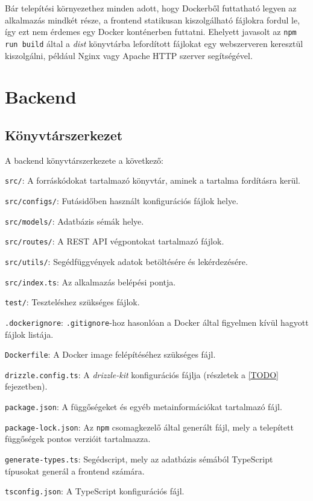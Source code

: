 Bár telepítési környezethez minden adott, hogy Dockerből futtatható legyen az alkalmazás mindkét része, a frontend statikusan kiszolgálható fájlokra fordul le, így ezt nem érdemes egy Docker konténerben futtatni. Ehelyett javasolt az \texttt{npm run build} által a \textit{dist} könyvtárba lefordított fájlokat egy webszerveren keresztül kiszolgálni, például Nginx vagy Apache HTTP szerver segítségével.

\section{Backend}

\subsection{Könyvtárszerkezet}

A backend könyvtárszerkezete a következő:

\begin{compactitem}
    \item \texttt{src/}: A forráskódokat tartalmazó könyvtár, aminek a tartalma fordításra kerül.
    \item \texttt{src/configs/}: Futásidőben használt konfigurációs fájlok helye.
    \item \texttt{src/models/}: Adatbázis sémák helye.
    \item \texttt{src/routes/}: A REST API végpontokat tartalmazó fájlok.
    \item \texttt{src/utils/}: Segédfüggvények adatok betöltésére és lekérdezésére.
    \item \texttt{src/index.ts}: Az alkalmazás belépési pontja.
    \item \texttt{test/}: Teszteléshez szükséges fájlok.
    \item \texttt{.dockerignore}: \texttt{.gitignore}-hoz hasonlóan a Docker által figyelmen kívül hagyott fájlok listája.
    \item \texttt{Dockerfile}: A Docker image felépítéséhez szükséges fájl.
    \item \texttt{drizzle.config.ts}: A \textit{drizzle-kit} konfigurációs fájlja (részletek a \ref{TODO} fejezetben).
    \item \texttt{package.json}: A függőségeket és egyéb metainformációkat tartalmazó fájl.
    \item \texttt{package-lock.json}: Az \texttt{npm} csomagkezelő által generált fájl, mely a telepített függőségek pontos verzióit tartalmazza.
    \item \texttt{generate-types.ts}: Segédscript, mely az adatbázis sémából TypeScript típusokat generál a frontend számára.
    \item \texttt{tsconfig.json}: A TypeScript konfigurációs fájl.
\end{compactitem}


